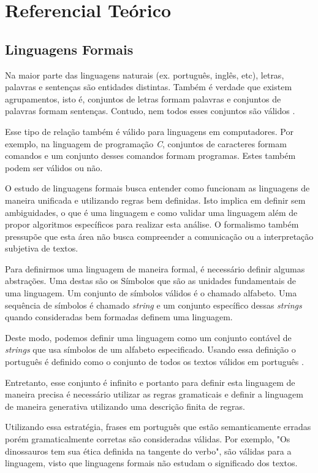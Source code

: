 \chapter[Referencial Teórico]{Referencial Teórico}

\section{Linguagens Formais}
\label{sec:languages}

Na maior parte das linguagens naturais (ex. português, inglês, etc),
letras, palavras e sentenças são entidades distintas.
Também é verdade que existem agrupamentos, isto é, conjuntos de letras
formam palavras e conjuntos de palavras formam sentenças. Contudo, 
nem todos esses conjuntos são válidos \cite{cohen1986}.

Esse tipo de relação também é válido para linguagens em computadores.
Por exemplo, na linguagem de programação \textit{C}, conjuntos de caracteres formam comandos
e um conjunto desses comandos formam programas. Estes também podem ser válidos ou não.

O estudo de linguagens formais busca entender como funcionam as linguagens de maneira unificada 
e utilizando regras bem definidas. Isto implica em definir sem ambiguidades, o que é uma linguagem e
como validar uma linguagem além de propor algoritmos específicos para realizar esta análise. 
O formalismo também pressupõe que esta área não busca compreender a comunicação ou a interpretação 
subjetiva de textos.

Para definirmos uma linguagem de maneira formal, é necessário definir algumas abstrações.
Uma destas são os Símbolos que são as unidades fundamentais de uma linguagem. Um conjunto
de símbolos válidos é o chamado alfabeto. Uma sequência de símbolos é chamado \textit{string} 
e um conjunto específico dessas \textit{strings} quando consideradas bem formadas definem uma linguagem. 

Deste modo, podemos definir uma linguagem 
como um conjunto contável de \textit{strings} que usa símbolos de um alfabeto especificado. 
Usando essa definição o português é definido como o conjunto de todos os textos 
válidos em português \cite{cohen1986}.

Entretanto, esse conjunto é infinito e portanto para definir esta linguagem de maneira precisa
é necessário utilizar as regras gramaticais e definir a linguagem de maneira
generativa utilizando uma descrição finita de regras. 

Utilizando essa estratégia, frases em português que estão semanticamente erradas porém gramaticalmente
corretas são consideradas válidas. Por exemplo, 
"Os dinossauros tem sua ética definida na tangente do verbo", são válidas para
a linguagem, visto que linguagens formais não estudam o significado dos textos.


